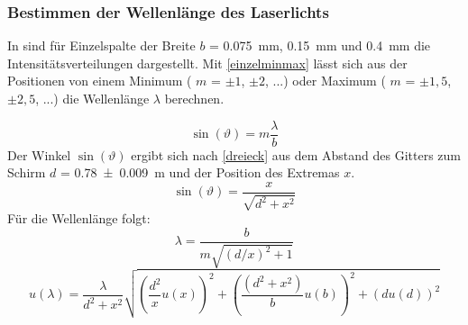 \documentclass[
	a4paper,
	12pt,
	pagesize,
	ngerman
]{scrartcl}
\begin{document}
	\subsubsection{Bestimmen der Wellenlänge des Laserlichts}
	In  sind für Einzelspalte der Breite $b$ = \SI{0,075}{mm}, \SI{0,15}{mm} und \SI{0,4}{mm} die Intensitätsverteilungen dargestellt. 
	Mit \cref{einzelminmax} lässt sich aus der Positionen von einem Minimum ( $m$ = $\pm1$, $\pm 2$, ...) oder Maximum ( $m$ = $\pm1,5$, $\pm 2,5$, ...) die Wellenlänge $\lambda$ berechnen. 
	
	\begin{equation}
		\sin(\vartheta) = m \frac{\lambda}{b}
		\label{einzelminmax}
	\end{equation}
	Der Winkel $\sin(\vartheta)$ ergibt sich nach \cref{dreieck} aus dem Abstand des Gitters zum Schirm $d$ = \SI{0,78 +- 0,009}{m} und der Position des Extremas $x$. 
	\begin{equation}
		\sin(\vartheta) = \frac{x}{\sqrt{d^2 + x^2}}
		\label{dreieck}
	\end{equation}
	Für die Wellenlänge folgt:
	\begin{equation}
		\lambda = \frac{b}{m\sqrt{(d/x)^2 + 1}}
	\end{equation}
	\begin{equation}
	u(\lambda) = \frac{\lambda}{d^2+x^2} \sqrt{\left( \frac{d^2}{x} u(x)\right)^2 + \left( \frac{(d^2+ x^2)}{b}u(b) \right) ^2 + \left( du(d) \right)^2}
	\end{equation}
	
\end{document}

